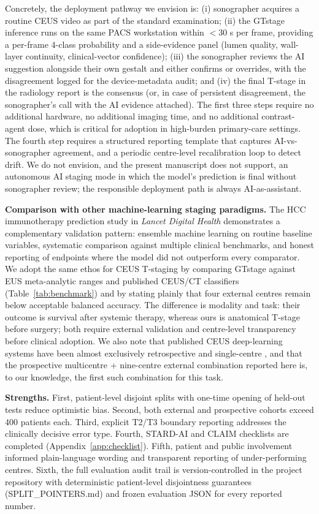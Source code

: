 \documentclass[11pt,a4paper]{article}
\begin{document}
Concretely, the deployment pathway we envision is: (i) sonographer acquires a routine CEUS video as part of the standard examination; (ii) the GTstage inference runs on the same PACS workstation within $<$30 s per frame, providing a per-frame 4-class probability and a side-evidence panel (lumen quality, wall-layer continuity, clinical-vector confidence); (iii) the sonographer reviews the AI suggestion alongside their own gestalt and either confirms or overrides, with the disagreement logged for the device-metadata audit; and (iv) the final T-stage in the radiology report is the consensus (or, in case of persistent disagreement, the sonographer's call with the AI evidence attached). The first three steps require no additional hardware, no additional imaging time, and no additional contrast-agent dose, which is critical for adoption in high-burden primary-care settings. The fourth step requires a structured reporting template that captures AI-vs-sonographer agreement, and a periodic centre-level recalibration loop to detect drift. We do not envision, and the present manuscript does not support, an autonomous AI staging mode in which the model's prediction is final without sonographer review; the responsible deployment path is always AI-as-assistant.

\textbf{Comparison with other machine-learning staging paradigms.} The HCC immunotherapy prediction study in \emph{Lancet Digital Health} \cite{ldh_hccml2026} demonstrates a complementary validation pattern: ensemble machine learning on routine baseline variables, systematic comparison against multiple clinical benchmarks, and honest reporting of endpoints where the model did not outperform every comparator. We adopt the same ethos for CEUS T-staging by comparing GTstage against EUS meta-analytic ranges and published CEUS/CT classifiers (Table~\ref{tab:benchmark}) and by stating plainly that four external centres remain below acceptable balanced accuracy. The difference is modality and task: their outcome is survival after systemic therapy, whereas ours is anatomical T-stage before surgery; both require external validation and centre-level transparency before clinical adoption. We also note that published CEUS deep-learning systems have been almost exclusively retrospective and single-centre \cite{liu2018ceus, zheng2017ceus, zheng2025interpretable}, and that the prospective multicentre + nine-centre external combination reported here is, to our knowledge, the first such combination for this task.

\textbf{Strengths.} First, patient-level disjoint splits with one-time opening of held-out tests reduce optimistic bias. Second, both external and prospective cohorts exceed 400 patients each. Third, explicit T2/T3 boundary reporting addresses the clinically decisive error type. Fourth, STARD-AI and CLAIM checklists are completed (Appendix~\ref{app:checklist}). Fifth, patient and public involvement informed plain-language wording and transparent reporting of under-performing centres. Sixth, the full evaluation audit trail is version-controlled in the project repository with deterministic patient-level disjointness guarantees (SPLIT\_POINTERS.md) and frozen evaluation JSON for every reported number.
\end{document}
